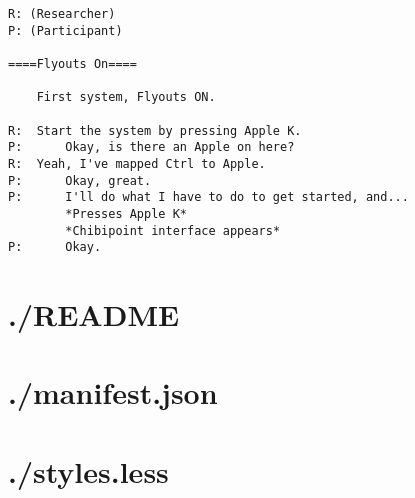 \documentclass[11pt,openright,a4paper]{report}
\begin{document}
    \begin{lstlisting}[caption={Transcript of Usability Study}, label={lst:usabilityTrans}, language=custom, style=basic, columns=fixed]
R: (Researcher)
P: (Participant)

====Flyouts On====

    First system, Flyouts ON.

R:  Start the system by pressing Apple K.
P:      Okay, is there an Apple on here?
R:  Yeah, I've mapped Ctrl to Apple.
P:      Okay, great.
P:      I'll do what I have to do to get started, and...
        *Presses Apple K*
        *Chibipoint interface appears*
P:      Okay.
\end{lstlisting}

\begin{landscape}
\begin{multicols}{2}
\newcommand{\mycodeinclude}[2]{

\section{./#2}

}

\newcommand{\mycodeincludejs}[1]{
\mycodeinclude{language=custom, alsolanguage=JavaScript, style=whatever}{#1}
}

\newcommand{\mycodeincludecss}[1]{
\mycodeinclude{language=custom, style=whatever}{#1}
}

\newcommand{\mycodeincludejson}[1]{
\mycodeinclude{language=custom, alsolanguage=JavaScript, style=whatever}{#1}
}

\newcommand{\mycodeincludeplain}[1]{
\mycodeinclude{language=custom, style=whatever}{#1}
}

% 

\mycodeincludeplain{README}

\mycodeincludejson{manifest.json}
\mycodeincludecss{styles.less}


\end{multicols}
\end{landscape}
\end{document}
